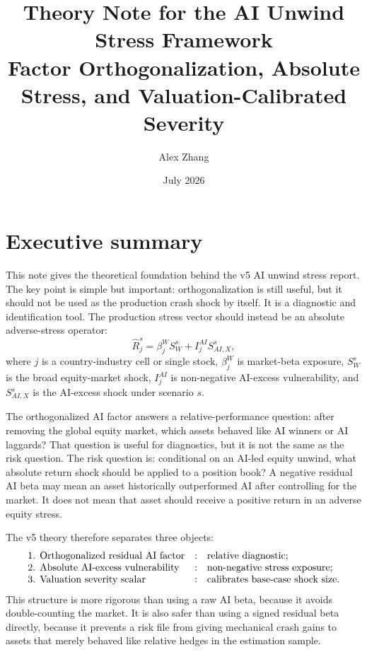 \documentclass[11pt]{article}
\begin{document}
\title{Theory Note for the AI Unwind Stress Framework\\Factor Orthogonalization, Absolute Stress, and Valuation-Calibrated Severity}
\author{Alex Zhang}
\date{July 2026}
\maketitle

\section*{Executive summary}

This note gives the theoretical foundation behind the v5 AI unwind stress report. The key point is simple but important: orthogonalization is still useful, but it should not be used as the production crash shock by itself. It is a diagnostic and identification tool. The production stress vector should instead be an absolute adverse-stress operator:
\[
\widehat R_j^s = \beta_j^W S_W^s + I_j^{AI} S_{AI,X}^s,
\]
where $j$ is a country-industry cell or single stock, $\beta_j^W$ is market-beta exposure, $S_W^s$ is the broad equity-market shock, $I_j^{AI}$ is non-negative AI-excess vulnerability, and $S_{AI,X}^s$ is the AI-excess shock under scenario $s$.

The orthogonalized AI factor answers a relative-performance question: after removing the global equity market, which assets behaved like AI winners or AI laggards? That question is useful for diagnostics, but it is not the same as the risk question. The risk question is: conditional on an AI-led equity unwind, what absolute return shock should be applied to a position book? A negative residual AI beta may mean an asset historically outperformed AI after controlling for the market. It does not mean that asset should receive a positive return in an adverse equity stress.

The v5 theory therefore separates three objects:
\[
\begin{array}{lll}
\hbox{1. Orthogonalized residual AI factor} &:& \hbox{relative diagnostic;}\\
\hbox{2. Absolute AI-excess vulnerability} &:& \hbox{non-negative stress exposure;}\\
\hbox{3. Valuation severity scalar} &:& \hbox{calibrates base-case shock size.}
\end{array}
\]
This structure is more rigorous than using a raw AI beta, because it avoids double-counting the market. It is also safer than using a signed residual beta directly, because it prevents a risk file from giving mechanical crash gains to assets that merely behaved like relative hedges in the estimation sample.
\end{document}
